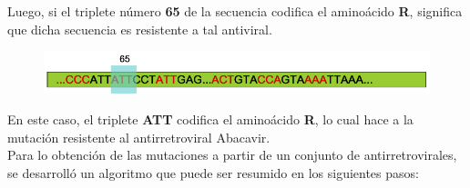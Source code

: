 Luego, si el triplete n\'umero \textbf{65} de la secuencia codifica el amino\'acido \textbf{R}, significa que dicha secuencia es resistente a tal antiviral.

\begin{figure}[H]
  \includegraphics[width=\linewidth]{images/secuencia.png}
\end{figure}
En este caso, el triplete \textbf{ATT} codifica el amino\'acido \textbf{R}, lo cual hace a la mutaci\'on resistente al antirretroviral Abacavir.\\
Para lo obtenci\'on de las mutaciones a partir de un conjunto de antirretrovirales, se desarroll\'o un algoritmo que puede ser resumido en los siguientes pasos:
\newpage
